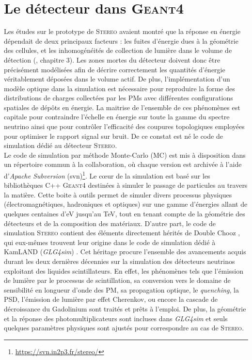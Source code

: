 \section{Le détecteur dans \textsc{Geant4}}

Les études sur le prototype de \textsc{Stereo} avaient montré que la réponse en énergie dépendait de deux principaux facteurs : les fuites d'énergie dues à la géométrie des cellules, et les inhomogénéités de collection de lumière dans le volume de détection  (\cite{bonhomme:tel-01931309}, chapitre 3). Les zones mortes du détecteur doivent donc être précisément modélisées afin de décrire correctement les quantités d'énergie véritablement déposées dans le volume actif. De plus, l'implémentation d'un modèle optique dans la simulation est nécessaire pour reproduire la forme des distributions de charges collectées par les PMs avec différentes configurations spatiales de dépôts en énergie. La maitrise de l'ensemble de ces phénomènes est capitale pour contraindre l'échelle en énergie sur toute la gamme du spectre neutrino ainsi que pour contrôler l'efficacité des coupures topologiques employées pour optimiser le rapport signal sur bruit. De ce constat est né le code de simulation dédié au détecteur \textsc{Stereo}.\\

Le code de simulation par méthode Monte-Carlo (MC) est mis à disposition dans un répertoire commun à la collaboration, où chaque version est archivée à l'aide d'\textit{Apache Subversion} (svn)\footnote{\url{https://svn.in2p3.fr/stereo/}}. Le c\oe ur de la simulation est basé sur les bibliothèques C++ \textsc{Geant4} \cite{Agostinelli:2002hh} destinées à simuler le passage de particules au travers la matière. Cette boite à outils permet de simuler divers processus physiques (électromagnétiques, hadroniques et optiques) sur une gamme d'énergies allant de quelques centaines d'eV jusqu'au TeV, tout en tenant compte de la géométrie des détecteurs et de la composition des matériaux. D'autre part, le code de simulation \textsc{Stereo} contient des éléments directement hérités de Double Chooz \cite{Abe:2014bwa}, qui eux-mêmes trouvent leur origine dans le code de simulation dédié à KamLAND (\textit{GLG4sim}) \cite{Smith:2005}. Cet héritage procure l'ensemble des avancements acquis durant les deux dernières décennies sur la simulation des détecteurs neutrinos exploitant des liquides scintillateurs. En effet, les phénomènes tels que l'émission de lumière par le processus de scintillation, sa conversion vers le domaine de sensibilité en longueur d'onde des PM, sa propagation optique, le \textit{quenching}, la PSD, l'émission de lumière par effet Cherenkov, ou encore la cascade de décroissance du Gadolinium sont traités et prêts à l'emploi. De plus, la géométrie et la réponse des photomultiplicateurs sont incluses dans \textit{GLG4sim} et seuls quelques paramètres physiques sont ajustés pour correspondre au cas de \textsc{Stereo}.\\

